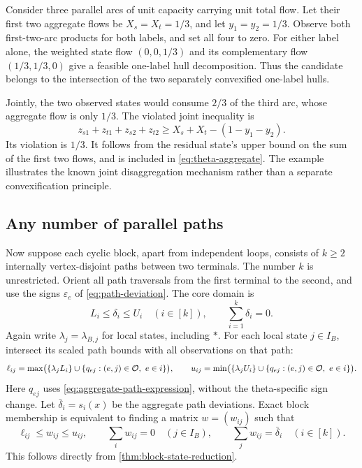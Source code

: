 \begin{example}\label{ex:joint-theta}
Consider three parallel arcs of unit capacity carrying unit total flow.
Let their first two aggregate flows be $X_s=X_t=1/3$, and let
$y_1=y_2=1/3$. Observe both first-two-arc products for both labels, and
set all four to zero. For either label alone, the weighted state flow
$(0,0,1/3)$ and its complementary flow $(1/3,1/3,0)$ give a feasible
one-label hull decomposition. Thus the candidate belongs to the
intersection of the two separately convexified one-label hulls.

Jointly, the two observed states would consume $2/3$ of the third arc,
whose aggregate flow is only $1/3$. The violated joint inequality is
\begin{equation}\label{eq:joint-theta-cut}
 z_{s1}+z_{t1}+z_{s2}+z_{t2}
       \ge X_s+X_t-(1-y_1-y_2).
\end{equation}
Its violation is $1/3$. It follows from the residual state's upper
bound on the sum of the first two flows, and is included in
\eqref{eq:theta-aggregate}. The example illustrates the known joint
disaggregation mechanism rather than a separate convexification principle.
\end{example}

\subsection{Any number of parallel paths}\label{subsec:parallel-paths}
Now suppose each cyclic block, apart from independent loops, consists of
$k\ge2$ internally vertex-disjoint paths between two terminals. The
number $k$ is unrestricted. Orient all path traversals from the first
terminal to the second, and use the signs $\varepsilon_e$ of
\eqref{eq:path-deviation}. The core domain is
\begin{equation}\label{eq:parallel-base}
 L_i\le\delta_i\le U_i\quad(i\in[k]),\qquad
                 \sum_{i=1}^k\delta_i=0.
\end{equation}
Again write $\lambda_j=\lambda_{B,j}$ for local states, including $*$.
For each local state $j\in I_B$, intersect its scaled path bounds with
all observations on that path:
\begin{equation}\label{eq:parallel-endpoints}
 \ell_{ij}=\max\bigl(\{\lambda_jL_i\}\cup
           \{q_{ej}:(e,j)\in\mathcal O,\ e\in i\}\bigr),\qquad
 u_{ij}=\min\bigl(\{\lambda_jU_i\}\cup
           \{q_{ej}:(e,j)\in\mathcal O,\ e\in i\}\bigr).
\end{equation}
Here $q_{ej}$ uses \eqref{eq:aggregate-path-expression}, without the
theta-specific sign change. Let $\bar\delta_i=s_i(x)$ be the aggregate
path deviations. Exact block membership is equivalent to finding a
matrix $w=(w_{ij})$ such that
\begin{equation}\label{eq:parallel-matrix}
 \ell_{ij}\le w_{ij}\le u_{ij},\qquad
 \sum_iw_{ij}=0\quad(j\in I_B),\qquad
 \sum_jw_{ij}=\bar\delta_i\quad(i\in[k]).
\end{equation}
This follows directly from \cref{thm:block-state-reduction}.

